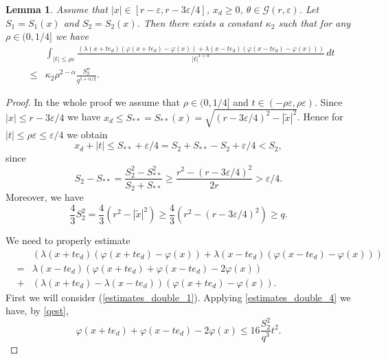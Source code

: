 \documentclass[a4paper,12pt,reqno]{amsart}
\newtheorem{lemma}[theorem]{Lemma}
\theoremstyle{definition}
\theoremstyle{remark}
\newcommand{\eps}{\varepsilon}
\newcommand{\calG}{\mathcal{G}}
\begin{document}
\begin{lemma}
\label{estimates_double}
Assume that $|x| \in [r - \eps, r - 3\eps/4]$, $x_d \ge 0$, $\theta \in \calG(r,\eps)$. Let $S_1= S_1(x)$ and $S_2= S_2(x)$. Then there exists a constant $\kappa_2$ such that for any $\rho \in (0,1/4]$ we have
\begin{eqnarray*}
&& \int_{|t| \le \rho \eps}
\frac{\left(\lambda(x + t e_d) (\varphi(x + t e_d) - \varphi(x)) 
+ \lambda(x - t e_d) (\varphi(x - t e_d) - \varphi(x))\right)}{|t|^{1+\alpha}} \, dt\\ 
&\le& \kappa_2 \rho^{2 - \alpha} \frac{S_2^\alpha}{q^{1+\alpha/2}}.
\end{eqnarray*}
\end{lemma}
\begin{proof} In the whole proof we assume that $\rho \in (0,1/4]$ and $t \in (-\rho \eps, \rho \eps)$. Since $|x|\le r-3\eps/4$ we have $x_d \le S_{**}= S_{**}(x)=\sqrt{(r-3\eps/4)^2-|\tilde{x}|^2}$.  
 Hence for $|t|\le \rho\eps\le \eps/4$ we obtain 
$$x_d + |t| \le S_{**}+ \eps/4  = S_2+ S_{**}-S_2 + \eps/4 < S_2,$$
since $$S_2-S_{**}= \frac  {S^2_2-S^2_{**}}{S_2+S_{**}}\ge \frac{ r^2 -(r-3\eps/4)^2}{2r}>\eps/4.$$
Moreover,  we have
\begin{equation} \frac43 S_2^2=\frac43 (r^2-|\tilde{x}|^2)\ge \frac43\left (r^2-(r-3\eps/4)^2\right)\ge q. \label{qest}\end{equation}

We need to properly estimate 
\begin{eqnarray}
\label{estimates_double_0}
&& \left(\lambda(x + t e_d) (\varphi(x + t e_d) - \varphi(x)) 
+ \lambda(x - t e_d) (\varphi(x - t e_d) - \varphi(x))\right)\\
\label{estimates_double_1}
&=& \lambda(x - t e_d) \left(\varphi(x + t e_d) + \varphi(x - t e_d) - 2 \varphi(x)\right)\\
\label{estimates_double_2}
&+& \left(\lambda(x + t e_d) - \lambda(x - t e_d)  \right) \left(\varphi(x + t e_d) - \varphi(x) \right).
\end{eqnarray}
First we will consider (\ref{estimates_double_1}). Applying \eqref{estimates_double_4} we have, by \eqref{qest},
\begin{equation}
\label{estimates_double_4n}
\varphi(x + t e_d) + \varphi(x - t e_d) - 2 \varphi(x)  \le 16 \frac{S_2^2} {q^3}t^2.
\end{equation}



\end{proof}
\end{document}
